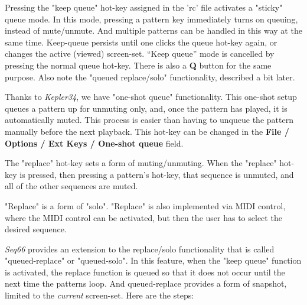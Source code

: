    Pressing the "keep queue" hot-key
   assigned in the 'rc' file activates a "sticky" queue mode.
   In this mode, pressing a pattern key immediately turns on queuing, instead
   of mute/unmute.  And multiple patterns can be handled in this way at the
   same time.
   Keep-queue persists until one clicks the queue hot-key again,
   or changes the active (viewed) screen-set. 
   “Keep queue” mode is cancelled by pressing the normal queue hot-key.
   There is also a \textbf{Q} button for the same purpose.
   Also note the "queued replace/solo" functionality, described a bit later.

   Thanks to \textsl{Kepler34}, we have "one-shot queue"
   functionality.  This one-shot setup queues a pattern up for unmuting only,
   and, once the pattern has played, it is automatically muted.  This process
   is easier than having to unqueue the pattern manually before the next
   playback.
   This hot-key can be changed in the
   \textbf{File / Options / Ext Keys / One-shot queue} field.

   The "replace" hot-key sets a form of muting/unmuting.
   When the "replace" hot-key is
   pressed, then pressing a pattern's hot-key,
   that sequence is unmuted, and all of the other sequences are muted.

   "Replace" is a form of "solo".
   "Replace" is also implemented via MIDI control,
   where the MIDI control can be activated, but then the user has to select
   the desired sequence.  

   \textsl{Seq66} provides an extension to the replace/solo functionality
   that is called "queued-replace" or "queued-solo".  In this feature, when
   the "keep queue" function is activated, the replace function is queued so
   that it does not occur until the next time the patterns loop.
   And queued-replace provides a form of snapshot, limited to the
   \textsl{current} screen-set.
   Here are the steps:

